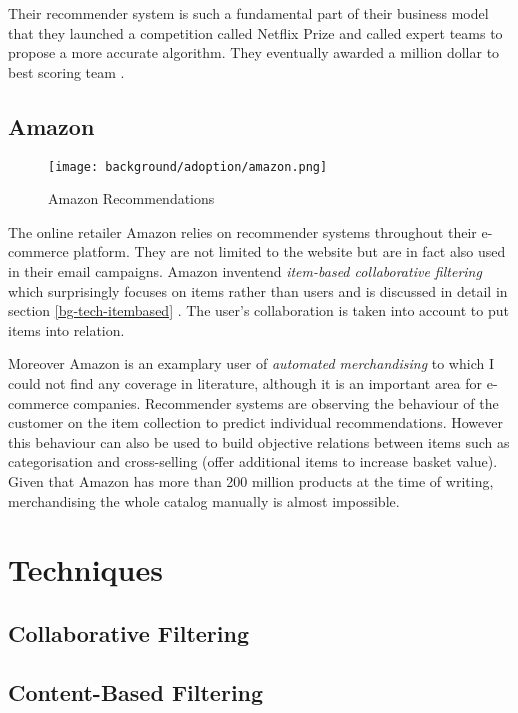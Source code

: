 Their recommender system is such a fundamental part of their business model that they launched a competition called Netflix Prize and called expert teams to propose a more accurate algorithm. They eventually awarded a million dollar to best scoring team \cite{netflix09}.

\subsection{Amazon}

\begin{figure}[ht]
    \texttt{[image: background/adoption/amazon.png]}
    \caption{Amazon Recommendations}
    \label{fig:amazon}
\end{figure}

The online retailer Amazon relies on recommender systems throughout their e-commerce platform. They are not limited to the website but are in fact also used in their email campaigns. Amazon inventend \textit{item-based collaborative filtering} which surprisingly focuses on items rather than users and is discussed in detail in section \ref{bg-tech-itembased} \cite{linden03}. The user's collaboration is taken into account to put items into relation.

Moreover Amazon is an examplary user of \textit{automated merchandising} to which I could not find any coverage in literature, although it is an important area for e-commerce companies. Recommender systems are observing the behaviour of the customer on the item collection to predict individual recommendations. However this behaviour can also be used to build objective relations between items such as categorisation and cross-selling (offer additional items to increase basket value). Given that Amazon has more than 200 million products at the time of writing, merchandising the whole catalog manually is almost impossible.

\section{Techniques}

\subsection{Collaborative Filtering}
\label{bg-tech-collaborative}
\label{bg-tech-itembased}

\subsection{Content-Based Filtering}
